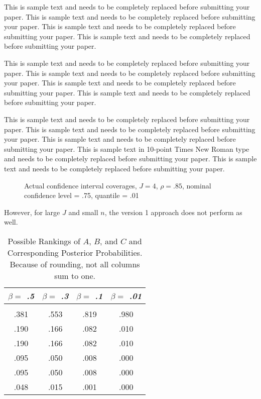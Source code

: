 \documentclass{asaproc}
\begin{document}
This is sample text and needs to be completely replaced before submitting your paper. This is sample text and needs to be completely replaced before submitting your paper. This is sample text and needs to be completely replaced before submitting your paper. This is sample text and needs to be completely replaced before submitting your paper.

This is sample text and needs to be completely replaced before submitting your paper. This is sample text and needs to be completely replaced before submitting your paper.  This is sample text and needs to be completely replaced before submitting your paper. This is sample text and needs to be completely replaced before submitting your paper.

This is sample text and needs to be completely replaced before submitting your paper. This is sample text and needs to be completely replaced before submitting your paper. This is sample text and needs to be completely replaced before submitting your paper. This is sample text in 10-point Times New Roman type and needs to be completely replaced before submitting your paper. This is sample text and needs to be completely replaced before submitting your paper.


\begin{figure*}
\vspace{12pc}
\caption{Actual confidence interval coverages,
$J = 4$, $\rho = .85$, nominal confidence level = .75,
quantile = .01}
\end{figure*}
However, for large $J$ and small $n$, the version 1 approach does not perform as well.


\begin{table}[b]
\caption{\enspace Possible Rankings of $A$, $B$, and $C$ and Corresponding 
Posterior Probabilities.  Because of rounding, not all columns sum to 
one.}\label{tab1}
\begin{tabular*}{\hsize}{@{\extracolsep{\fill}}cccc}
\\[-5pt]
\multicolumn{1}{c}{\it $\beta =$ .5} & 
\multicolumn{1}{c}{\it $\beta =$ .3} & 
\multicolumn{1}{c}{\it $\beta =$ .1} & 
\multicolumn{1}{c}{\it $\beta =$ .01}\\
\hline
\\[-5pt]
.381 & .553 & .819 & .980 \\ 
        .190 & .166 & .082 & .010 \\
        .190 & .166 & .082 & .010 \\
        .095 & .050 & .008 & .000 \\
         .095 &  .050 &  .008 &  .000 \\
         .048 &  .015 &  .001 &   .000 \\
\hline
\end{tabular*}
\end{table} 
\end{document}
